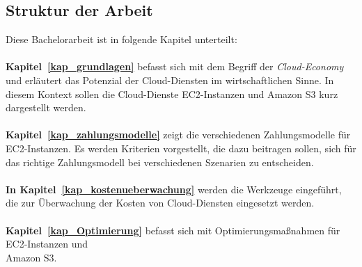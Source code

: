 \subsection{Struktur der Arbeit}


Diese Bachelorarbeit ist in folgende Kapitel unterteilt:\\\\
\textbf{Kapitel~\ref{kap_grundlagen}} 
befasst sich mit dem Begriff der \textit{Cloud-Economy} und erläutert das Potenzial der Cloud-Diensten im wirtschaftlichen Sinne. In diesem Kontext sollen die Cloud-Dienste EC2-Instanzen und Amazon S3 kurz dargestellt werden. 
\\\\
\textbf{Kapitel~\ref{kap_zahlungsmodelle}} 
zeigt die verschiedenen Zahlungsmodelle für EC2-Instanzen. Es werden Kriterien vorgestellt, die dazu beitragen sollen, sich für das richtige Zahlungsmodell bei verschiedenen Szenarien zu entscheiden. 
\\\\
\textbf{In Kapitel~\ref{kap_kostenueberwachung}} werden die Werkzeuge eingeführt, die zur Überwachung der Kosten von Cloud-Diensten eingesetzt werden.
\\\\
\textbf{Kapitel~\ref{kap_Optimierung}} befasst sich mit Optimierungsmaßnahmen %
für EC2-Instanzen und \\Amazon S3.

 
